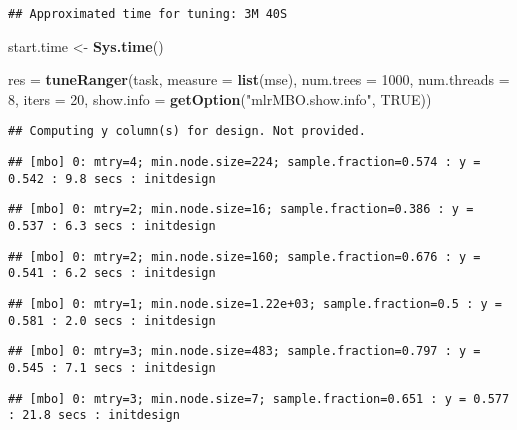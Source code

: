 \documentclass[
]{article}
\newenvironment{Shaded}{\begin{snugshade}}{\end{snugshade}}
\newcommand{\DataTypeTok}[1]{\textcolor[rgb]{0.13,0.29,0.53}{#1}}
\newcommand{\DecValTok}[1]{\textcolor[rgb]{0.00,0.00,0.81}{#1}}
\newcommand{\KeywordTok}[1]{\textcolor[rgb]{0.13,0.29,0.53}{\textbf{#1}}}
\newcommand{\NormalTok}[1]{#1}
\newcommand{\OtherTok}[1]{\textcolor[rgb]{0.56,0.35,0.01}{#1}}
\newcommand{\StringTok}[1]{\textcolor[rgb]{0.31,0.60,0.02}{#1}}
\begin{document}
\begin{verbatim}
## Approximated time for tuning: 3M 40S
\end{verbatim}

\begin{Shaded}
\begin{Highlighting}[]
\NormalTok{start.time <-}\StringTok{ }\KeywordTok{Sys.time}\NormalTok{()}

     
\NormalTok{res =}\StringTok{ }\KeywordTok{tuneRanger}\NormalTok{(task, }\DataTypeTok{measure =} \KeywordTok{list}\NormalTok{(mse), }\DataTypeTok{num.trees =} \DecValTok{1000}\NormalTok{, }
                 \DataTypeTok{num.threads =} \DecValTok{8}\NormalTok{, }\DataTypeTok{iters =} \DecValTok{20}\NormalTok{,  }\DataTypeTok{show.info =} \KeywordTok{getOption}\NormalTok{(}\StringTok{"mlrMBO.show.info"}\NormalTok{, }\OtherTok{TRUE}\NormalTok{))}
\end{Highlighting}
\end{Shaded}

\begin{verbatim}
## Computing y column(s) for design. Not provided.
\end{verbatim}

\begin{verbatim}
## [mbo] 0: mtry=4; min.node.size=224; sample.fraction=0.574 : y = 0.542 : 9.8 secs : initdesign
\end{verbatim}

\begin{verbatim}
## [mbo] 0: mtry=2; min.node.size=16; sample.fraction=0.386 : y = 0.537 : 6.3 secs : initdesign
\end{verbatim}

\begin{verbatim}
## [mbo] 0: mtry=2; min.node.size=160; sample.fraction=0.676 : y = 0.541 : 6.2 secs : initdesign
\end{verbatim}

\begin{verbatim}
## [mbo] 0: mtry=1; min.node.size=1.22e+03; sample.fraction=0.5 : y = 0.581 : 2.0 secs : initdesign
\end{verbatim}

\begin{verbatim}
## [mbo] 0: mtry=3; min.node.size=483; sample.fraction=0.797 : y = 0.545 : 7.1 secs : initdesign
\end{verbatim}

\begin{verbatim}
## [mbo] 0: mtry=3; min.node.size=7; sample.fraction=0.651 : y = 0.577 : 21.8 secs : initdesign
\end{verbatim}
\end{document}
